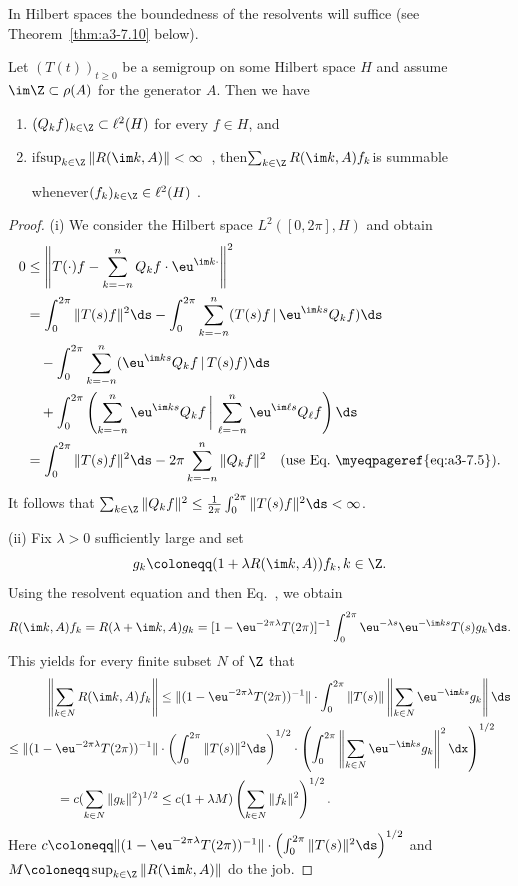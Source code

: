 In Hilbert spaces the boundedness of the resolvents will suffice (see Theorem~\ref{thm:a3-7.10} below).
\begin{lemma}\label{lem:a3-7.9}
Let $(T(t))_{t\geq 0}$ be a semigroup on some Hilbert space $H$ and assume $\im\Z \subset \rho(A)$ for the generator $A$.
Then we have
\begin{enumerate}[\upshape (i)]
\item 
$(Q_{k}f)_{k\in\Z} \subset \ell^{2}(H)$ for every $f \in H$, and

\item 
if\quad $\sup_{k\in\Z}\|R(\im k,A)\| < \infty$~, then\quad $\sum_{k\in\Z} R(\im k,A)f_{k}$\quad is summable 

whenever\quad $(f_{k})_{k\in\Z} \in \ell^{2}(H)$ .
\end{enumerate}
\end{lemma}
\begin{proof}
(i) We consider the Hilbert space $L^{2}([0,2\pi],H)$ and obtain
\begin{align*}
0 &\leq \left\|T(\cdot)f - \sum_{k=-n}^{n} Q_{k}f\cdot \eu^{\im k\cdot}\right\|^{2} \\
&= \int_{0}^{2\pi} \|T(s)f\|^{2} \ds 
   - \int_{0}^{2\pi} \sum_{k=-n}^{n} (T(s)f \,\vert\, \eu^{\im ks}Q_{k}f) \ds \\
&\quad - \int_{0}^{2\pi} \sum_{k=-n}^{n} (\eu^{\im ks}Q_{k}f  \,\vert\, T(s)f) \ds \\
&\quad + \int_{0}^{2\pi} \left(\sum_{k=-n}^{n} \eu^{\im ks}Q_{k}f
        \,\bigg\vert\,  \sum_{\ell=-n}^{n} \eu^{\im \ell s}Q_{\ell}f\right) \ds \\
&= \int_{0}^{2\pi} \|T(s)f\|^{2} \ds - 2\pi\sum_{k=-n}^{n} \|Q_{k}f\|^{2}
   \quad \text{(use Eq.~\myeqpageref{eq:a3-7.5})}.
\end{align*}
It follows that $\sum_{k\in\Z} \|Q_{k}f\|^{2} \leq \frac{1}{2\pi}\int_{0}^{2\pi} \|T(s)f\|^{2} \ds < \infty$.

(ii) Fix $\lambda > 0$ sufficiently large and set 
\[
g_{k}\coloneqq (1 + \lambda R(\im k,A))f_{k}, k \in \Z .
\]
Using the resolvent equation and then Eq.~, we obtain
\[
R(\im k,A)f_{k} = R(\lambda + \im k,A)g_{k} = [1 - \eu^{-2\pi\lambda}T(2\pi)]^{-1}\int_{0}^{2\pi} \eu^{-\lambda s}\eu^{-\im ks}T(s)g_{k} \ds .
\]
This yields for every finite subset $N$ of\/ $\Z$ that
\begin{align*}
	\left\|\sum_{k\in N} R(\im k,A)f_{k}\right\| & 
		\leq \|(1 - \eu^{-2\pi\lambda}T(2\pi))^{-1}\|\cdot\int_{0}^{2\pi} \|T(s)\| 
			\left\|\sum_{k\in N} \eu^{-\im ks}g_{k}\right\| \ds
\\
	\leq \|(1 - \eu^{-2\pi\lambda}T(2\pi))^{-1}\| & \cdot 
	\left(\int_{0}^{2\pi}\|T(s)\|^{2} \ds\right)^{1/2} \cdot \left(\int_{0}^{2\pi}\left\|\sum_{k\in N} 
	\eu^{-\im ks}g_{k}\right\|^{2} \dx \right)^{1/2}
\\
	= c(\sum_{k\in N} \|g_{k}\|^{2})^{1/2} & \leq c(1 + \lambda M)\left(\sum_{k\in N} \|f_{k}\|^{2}\right)^{1/2} .
\end{align*}
Here $c\coloneqq \|(1 - \eu^{-2\pi\lambda}T(2\pi))^{-1}\|\cdot\left(\int_{0}^{2\pi}\|T(s)\|^{2} \ds\right)^{1/2}$ and $M\coloneqq \sup_{k\in\Z}\|R(\im k,A)\|$ do the job.
\end{proof}
